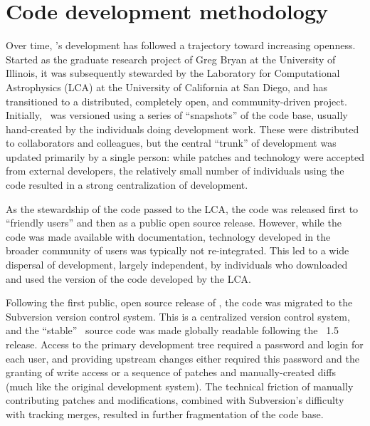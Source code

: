 
\section{Code development methodology}
\label{sec.development}

Over time, \enzo's development has followed a trajectory toward
increasing openness.  Started as the graduate research project of Greg Bryan at
the University of Illinois, it was subsequently stewarded by the
Laboratory for Computational Astrophysics (LCA) at the University of
California at San Diego, and has transitioned to a distributed,
completely open, and community-driven project.  Initially, \enzo\ was
versioned using a series of ``snapshots'' of the code base, usually
hand-created by the individuals doing development work.  These were
distributed to collaborators and colleagues, but the central ``trunk''
of development was updated primarily by a single person: while patches
and technology were accepted from external developers, the relatively
small number of individuals using the code resulted in a strong
centralization of development.

As the stewardship of the code passed to the LCA, the code was
released first to ``friendly users'' and then as a public open source
release.  However, while the code was made available with
documentation, technology developed in the broader community of users
was typically not re-integrated.  This led to a wide dispersal of
development, largely independent, by individuals who downloaded and
used the version of the code developed by the LCA.


Following the first public, open source release of \enzo, the code was
migrated to the Subversion version control system.  This is a
centralized version control system, and the ``stable'' \enzo\ source
code was made globally readable following the \enzo\ 1.5 release.
Access to the primary development tree required a password and login
for each user, and providing upstream changes either required this
password and the granting of write access or a sequence of patches and
manually-created diffs (much like the original development system).
The technical friction of manually contributing patches and
modifications, combined with Subversion's difficulty with tracking
merges, resulted in further fragmentation of the code base.

